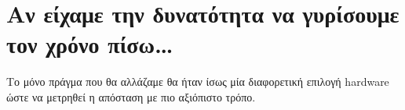 \section{Αν είχαμε την δυνατότητα να γυρίσουμε τον χρόνο πίσω\ldots}
Το μόνο πράγμα που θα αλλάζαμε θα ήταν ίσως μία διαφορετική επιλογή hardware ώστε να μετρηθεί η απόσταση με πιο αξιόπιστο τρόπο.
